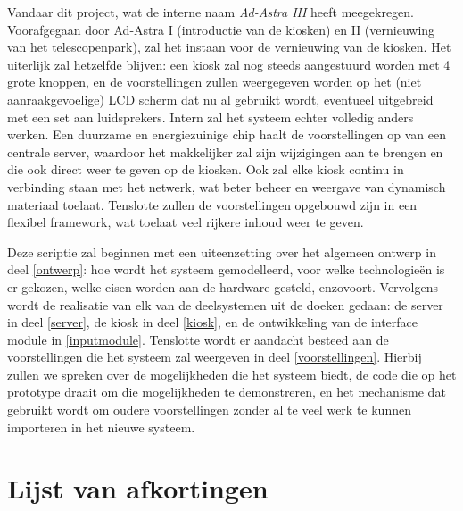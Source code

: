 Vandaar dit project, wat de interne naam \emph{Ad-Astra III} heeft meegekregen. Voorafgegaan door Ad-Astra I (introductie van de kiosken) en II (vernieuwing van het telescopenpark), zal het instaan voor de vernieuwing van de kiosken. Het uiterlijk zal hetzelfde blijven: een kiosk zal nog steeds aangestuurd worden met 4 grote knoppen, en de voorstellingen zullen weergegeven worden op het (niet aanraakgevoelige) LCD scherm dat nu al gebruikt wordt, eventueel uitgebreid met een set aan luidsprekers.
Intern zal het systeem echter volledig anders werken. Een duurzame en energiezuinige chip haalt de voorstellingen op van een centrale server, waardoor het makkelijker zal zijn wijzigingen aan te brengen en die ook direct weer te geven op de kiosken. Ook zal elke kiosk continu in verbinding staan met het netwerk, wat beter beheer en weergave van dynamisch materiaal toelaat. Tenslotte zullen de voorstellingen opgebouwd zijn in een flexibel framework, wat toelaat veel rijkere inhoud weer te geven.

Deze scriptie zal beginnen met een uiteenzetting over het algemeen ontwerp in deel \ref{ontwerp}: hoe wordt het systeem gemodelleerd, voor welke technologieën is er gekozen, welke eisen worden aan de hardware gesteld, enzovoort.
Vervolgens wordt de realisatie van elk van de deelsystemen uit de doeken gedaan: de server in deel \ref{server}, de kiosk in deel \ref{kiosk}, en de ontwikkeling van de interface module in \ref{inputmodule}.
Tenslotte wordt er aandacht besteed aan de voorstellingen die het systeem zal weergeven in deel \ref{voorstellingen}. Hierbij zullen we spreken over de mogelijkheden die het systeem biedt, de code die op het prototype draait om die mogelijkheden te demonstreren, en het mechanisme dat gebruikt wordt om oudere voorstellingen zonder al te veel werk te kunnen importeren in het nieuwe systeem.

\clearpage


%
%

\setlength\cftpartnumwidth{4em}
\tableofcontents

\clearpage


%
%

\chapter*{Lijst van afkortingen}

\acresetall
\clearpage


